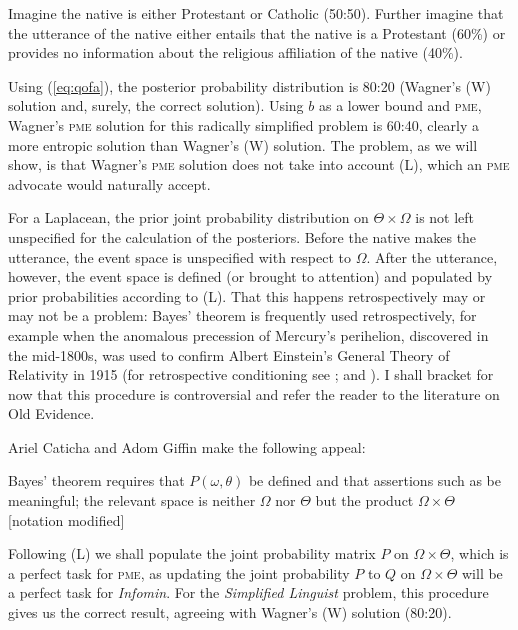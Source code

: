 \documentclass[phd,12pt,oneside]{ubcthesis}
\begin{document}
\begin{quotex}
  \label{ex:simpllinguist} Imagine the
  native is either Protestant or Catholic (50:50). Further imagine
  that the utterance of the native either entails that the native is a
  Protestant (60\%) or provides no information about the religious
  affiliation of the native (40\%).
\end{quotex}

Using (\ref{eq:qofa}), the posterior probability distribution is 80:20
(Wagner's (W) solution and, surely, the correct solution). Using $b$
as a lower bound and \textsc{pme}, Wagner's \textsc{pme} solution for this radically
simplified problem is 60:40, clearly a more entropic solution than
Wagner's (W) solution. The problem, as we will show, is that Wagner's
\textsc{pme} solution does not take into account (L), which an \textsc{pme} advocate
would naturally accept.

For a Laplacean, the prior joint probability distribution on
$\Theta\times\Omega$ is not left unspecified for the calculation of
the posteriors. Before the native makes the utterance, the event space
is unspecified with respect to $\Omega$. After the utterance, however,
the event space is defined (or brought to attention) and populated by
prior probabilities according to (L). That this happens
retrospectively may or may not be a problem: Bayes' theorem is
frequently used retrospectively, for example when the anomalous
precession of Mercury's perihelion, discovered in the mid-1800s, was
used to confirm Albert Einstein's General Theory of Relativity in 1915
(for retrospective conditioning see ; and
). I shall bracket for now that this
procedure is controversial and refer the reader to the literature on
Old Evidence.

Ariel Caticha and Adom Giffin make the following
appeal:

\begin{quotex}
  Bayes' theorem requires that $P(\omega,\theta)$ be defined and that
  assertions such as  be
  meaningful; the relevant space is neither $\Omega$ nor $\Theta$ but
  the product $\Omega\times\Theta$ [notation modified]
\end{quotex}

Following (L) we shall populate the joint probability matrix $P$ on
$\Omega\times\Theta$, which is a perfect task for \textsc{pme}, as
updating the joint probability $P$ to $Q$ on $\Omega\times\Theta$ will
be a perfect task for \emph{Infomin}. For the \emph{Simplified
  Linguist} problem, this procedure gives us the correct result,
agreeing with Wagner's (W) solution (80:20).
\end{document}
